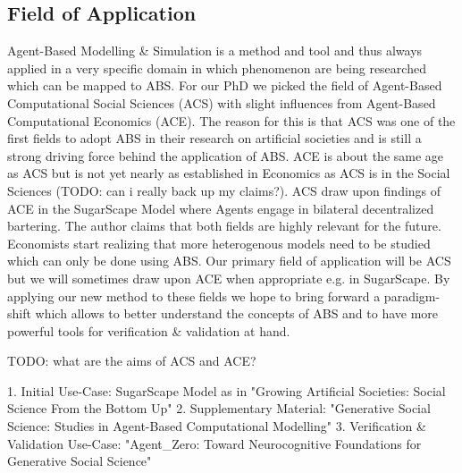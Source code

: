 \subsection{Field of Application}
Agent-Based Modelling \& Simulation is a method and tool and thus always applied in a very specific domain in which phenomenon are being researched which can be mapped to ABS. For our PhD we picked the field of Agent-Based Computational Social Sciences (ACS) with slight influences from Agent-Based Computational Economics (ACE). The reason for this is that ACS was one of the first fields to adopt ABS in their research on artificial societies and is still a strong driving force behind the application of ABS. ACE is about the same age as ACS but is not yet nearly as established in Economics as ACS is in the Social Sciences (TODO: can i really back up my claims?). ACS draw upon findings of ACE in the SugarScape Model where Agents engage in bilateral decentralized bartering. The author claims that both fields are highly relevant for the future. Economists start realizing that more heterogenous models need to be studied which can only be done using ABS.
Our primary field of application will be ACS but we will sometimes draw upon ACE when appropriate e.g. in SugarScape. By applying our new method to these fields we hope to bring forward a paradigm-shift which allows to better understand the concepts of ABS and to have more powerful tools for verification \& validation at hand.

TODO: what are the aims of ACS and ACE?

1. Initial Use-Case: SugarScape Model as in "Growing Artificial Societies: Social Science From the Bottom Up"
2. Supplementary Material: "Generative Social Science: Studies in Agent-Based Computational Modelling"
3. Verification \& Validation Use-Case: "Agent\_Zero: Toward Neurocognitive Foundations for Generative Social Science"

